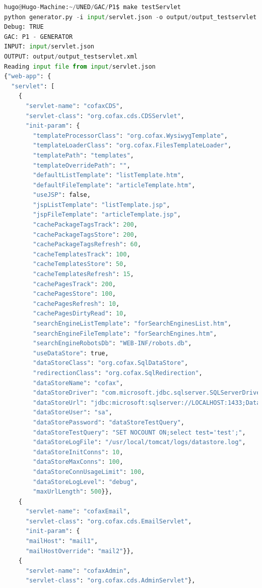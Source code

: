 \documentclass[a4paper,11pt]{book}
\begin{document}
\begin{lstlisting}[language=python,caption={make testServlet }]
hugo@Hugo-Machine:~/UNED/GAC/P1$ make testServlet 
python generator.py -i input/servlet.json -o output/output_testservlet.xml -d
Debug: TRUE
GAC: P1 - GENERATOR
INPUT: input/servlet.json
OUTPUT: output/output_testservlet.xml
Reading input file from input/servlet.json
{"web-app": {
  "servlet": [
    {
      "servlet-name": "cofaxCDS",
      "servlet-class": "org.cofax.cds.CDSServlet",
      "init-param": {
        "templateProcessorClass": "org.cofax.WysiwygTemplate",
        "templateLoaderClass": "org.cofax.FilesTemplateLoader",
        "templatePath": "templates",
        "templateOverridePath": "",
        "defaultListTemplate": "listTemplate.htm",
        "defaultFileTemplate": "articleTemplate.htm",
        "useJSP": false,
        "jspListTemplate": "listTemplate.jsp",
        "jspFileTemplate": "articleTemplate.jsp",
        "cachePackageTagsTrack": 200,
        "cachePackageTagsStore": 200,
        "cachePackageTagsRefresh": 60,
        "cacheTemplatesTrack": 100,
        "cacheTemplatesStore": 50,
        "cacheTemplatesRefresh": 15,
        "cachePagesTrack": 200,
        "cachePagesStore": 100,
        "cachePagesRefresh": 10,
        "cachePagesDirtyRead": 10,
        "searchEngineListTemplate": "forSearchEnginesList.htm",
        "searchEngineFileTemplate": "forSearchEngines.htm",
        "searchEngineRobotsDb": "WEB-INF/robots.db",
        "useDataStore": true,
        "dataStoreClass": "org.cofax.SqlDataStore",
        "redirectionClass": "org.cofax.SqlRedirection",
        "dataStoreName": "cofax",
        "dataStoreDriver": "com.microsoft.jdbc.sqlserver.SQLServerDriver",
        "dataStoreUrl": "jdbc:microsoft:sqlserver://LOCALHOST:1433;DatabaseName=goon",
        "dataStoreUser": "sa",
        "dataStorePassword": "dataStoreTestQuery",
        "dataStoreTestQuery": "SET NOCOUNT ON;select test='test';",
        "dataStoreLogFile": "/usr/local/tomcat/logs/datastore.log",
        "dataStoreInitConns": 10,
        "dataStoreMaxConns": 100,
        "dataStoreConnUsageLimit": 100,
        "dataStoreLogLevel": "debug",
        "maxUrlLength": 500}},
    {
      "servlet-name": "cofaxEmail",
      "servlet-class": "org.cofax.cds.EmailServlet",
      "init-param": {
      "mailHost": "mail1",
      "mailHostOverride": "mail2"}},
    {
      "servlet-name": "cofaxAdmin",
      "servlet-class": "org.cofax.cds.AdminServlet"},


\end{lstlisting}
\end{document}
